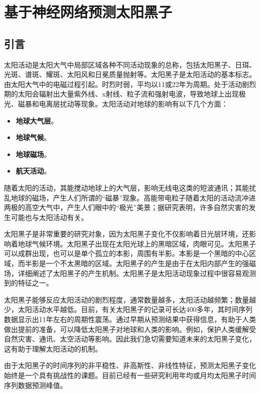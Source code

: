 \chapter{基于神经网络预测太阳黑子}\label{chap:ml_sunspot}

\section{引言}\label{sec:ss_intro}

太阳活动是太阳大气中局部区域各种不同活动现象的总称，包括太阳黑子、日珥、光斑、谱斑、耀斑、太阳风和日冕质量抛射等。太阳黑子是太阳活动的基本标志。由太阳大气中的电磁过程引起。时烈时弱，平均以11或22年为周期。处于活动剧烈期的太阳会辐射出大量紫外线、x射线、粒子流和强射电波，导致地球上出现极光、磁暴和电离层扰动等现象。太阳活动对地球的影响有以下几个方面\citet{jie2012prediction}：
\begin{itemize}
  \item \textbf{地球大气层}。
  \item \textbf{地球气候}。
  \item \textbf{地球磁场}。
  \item \textbf{航天活动}。
\end{itemize}
随着太阳的活动，其能搅动地球上的大气层，影响无线电这类的短波通讯；其能扰乱地球的磁场，产生人们所谓的“磁暴”现象。高能带电粒子随着太阳的活动流冲进两极的高空大气中，产生人们眼中的“极光”美景；据研究表明，许多自然灾害的发生可能也与太阳活动有关。


太阳黑子是非常重要的研究对象，因为太阳黑子变化不仅影响着日光层环境，还影响着地球气候环境。太阳黑子出现在太阳光球上的黑暗区域，肉眼可见。太阳黑子可以成群出现，也可以是单个孤立的本影，周围有半影。本影是一个黑暗的中心区域，而半影是一个不太黑暗的区域。太阳黑子的产生是由于在太阳内部产生的强磁场，\citet{noyes2013sun}详细阐述了太阳黑子的产生机制。太阳黑子是太阳活动现象过程中很容易观测到的特征之一。

太阳黑子能够反应太阳活动的剧烈程度，通常数量越多，太阳活动越频繁；数量越少，太阳活动水平越低。目前，有关太阳黑子的记录可长达400多年，其时间序列数据显示出11年左右的周期性震荡。通过早期从预测结果中获得信息，有助于人类做出提前的准备，可以降低太阳黑子对地球和人类的影响。例如，保护人类缓解受自然灾害、通讯、太空活动等影响。因此我们急切需要知道未来的太阳黑子变化，这有助于理解太阳活动的机制。

由于太阳黑子的时间序列的非平稳性、非高斯性、非线性特征，预测太阳黑子变化始终是一个具有挑战性的课题。目前已经有一些研究利用年均或月均太阳黑子时间序列数据预测峰值。

